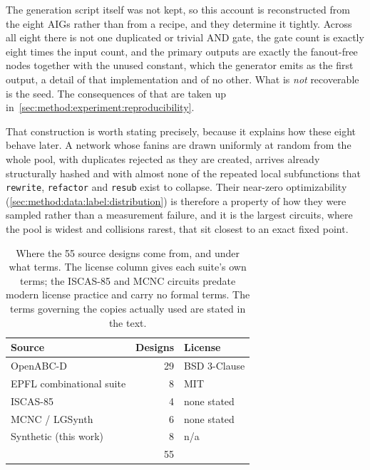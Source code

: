 The generation script itself was not kept, so this account is reconstructed from the eight
AIGs rather than from a recipe, and they determine it tightly. Across all eight there is not
one duplicated or trivial AND gate, the gate count is exactly eight times the input count,
and the primary outputs are exactly the fanout-free nodes together with the unused constant,
which the generator emits as the first output, a detail of that implementation and of no
other. What is \emph{not} recoverable is the seed. The consequences of that are taken up
in~\ref{sec:method:experiment:reproducibility}.

That construction is worth stating precisely, because it explains how these eight behave
later. A network whose fanins are drawn uniformly at random from the whole pool, with
duplicates rejected as they are created, arrives already structurally hashed and with almost
none of the repeated local subfunctions that \texttt{rewrite}, \texttt{refactor} and
\texttt{resub} exist to collapse. Their near-zero optimizability
(\ref{sec:method:data:label:distribution}) is therefore a property of how they were sampled
rather than a measurement failure, and it is the largest circuits, where the pool is widest
and collisions rarest, that sit closest to an exact fixed point.

\begin{table}[htbp]
\centering
\caption{Where the 55 source designs come from, and under what terms. The license column
gives each suite's own terms; the ISCAS-85 and MCNC circuits predate modern license
practice and carry no formal terms. The terms governing the copies actually used are
stated in the text.}
\label{tab:source_circuits}
\small
\begin{tabular}{lrl}
\toprule
\textbf{Source} & \textbf{Designs} & \textbf{License} \\
\midrule
OpenABC-D \citep{chowdhury2021openabc} & 29 & BSD 3-Clause \\
EPFL combinational suite \citep{amaru2015epfl} & 8 & MIT \\
ISCAS-85 \citep{brglez1985iscas} & 4 & none stated \\
MCNC / LGSynth \citep{yang1991mcnc} & 6 & none stated \\
Synthetic (this work) & 8 & n/a \\
\midrule
                                & 55 & \\
\bottomrule
\end{tabular}
\end{table}

